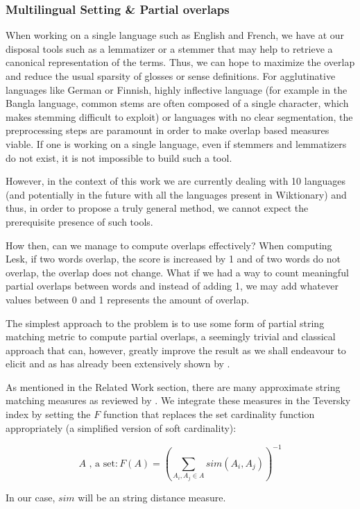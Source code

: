 \documentclass[10pt, a4paper]{article}
\begin{document}
\subsubsection{Multilingual Setting \& Partial overlaps}
 When working on a single language such as English and French, we have at our disposal tools such as a lemmatizer or a stemmer that may help to retrieve a canonical representation of the terms. Thus, we can hope to maximize the overlap and reduce the usual sparsity of glosses or sense definitions. For agglutinative languages like German or Finnish, highly inflective language (for example in the Bangla language, common stems are often composed of a single character, which makes stemming difficult to exploit) or languages with no clear segmentation, the preprocessing steps are paramount in order to make overlap based measures viable. If one is working on a single language, even if stemmers and lemmatizers do not exist, it is not impossible to build such a tool.

However, in the context of this work we are currently dealing with 10 languages (and potentially in the future with all the languages present in Wiktionary) and thus, in order to propose a truly general method, we cannot expect the prerequisite presence of such tools. 

How then, can we manage to compute overlaps effectively? When computing Lesk, if two words overlap, the score is increased by 1 and of two words do not overlap, the overlap does not change. What if we had a way to count meaningful partial overlaps between words and instead of adding 1, we may add whatever values between 0 and 1 represents the amount of overlap.

The simplest approach to the problem is to use some form of partial string matching metric to compute partial overlaps, a seemingly trivial and classical approach that can, however, greatly improve the result as we shall endeavour to elicit and as has already been extensively shown by \cite{Jimenez2012}. 

As mentioned in the Related Work section, there are many approximate string matching measures as reviewed by \cite{Cohen2003}. We integrate these measures in the Teversky index by setting the \(F\) function that replaces the set cardinality function appropriately (a simplified version of soft cardinality):

\[
	A \mbox{ , a set} : F(A) = (\sum_{A_i,A_j \in A}sim(A_i, A_j))^{-1}
\]

In our case, \(sim\) will be an string distance measure.
\end{document}
